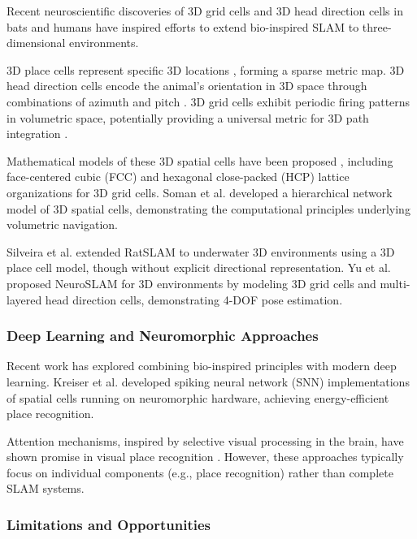 Recent neuroscientific discoveries of 3D grid cells and 3D head direction cells in bats \cite{Finkelstein2015, Finkelstein2016} and humans \cite{Kim2017, Kim2018a, Kim2018b, Kim2019} have inspired efforts to extend bio-inspired SLAM to three-dimensional environments.

3D place cells represent specific 3D locations \cite{Yartsev2013, Wohlgemuth2018}, forming a sparse metric map.
3D head direction cells encode the animal's orientation in 3D space through combinations of azimuth and pitch \cite{Finkelstein2015, Page2018, Shinder2019}.
3D grid cells exhibit periodic firing patterns in volumetric space, potentially providing a universal metric for 3D path integration \cite{Finkelstein2016, Casali2019}.

Mathematical models of these 3D spatial cells have been proposed \cite{Jeffery2013, Jeffery2015}, including face-centered cubic (FCC) and hexagonal close-packed (HCP) lattice organizations for 3D grid cells.
Soman et al. \cite{Soman2018} developed a hierarchical network model of 3D spatial cells, demonstrating the computational principles underlying volumetric navigation.

Silveira et al. \cite{Silveira2013, Silveira2015} extended RatSLAM to underwater 3D environments using a 3D place cell model, though without explicit directional representation.
Yu et al. proposed NeuroSLAM for 3D environments by modeling 3D grid cells and multi-layered head direction cells, demonstrating 4-DOF pose estimation.

\subsubsection{Deep Learning and Neuromorphic Approaches}

Recent work has explored combining bio-inspired principles with modern deep learning.
Kreiser et al. \cite{Kreiser2018a, Kreiser2018b} developed spiking neural network (SNN) implementations of spatial cells running on neuromorphic hardware, achieving energy-efficient place recognition.

Attention mechanisms, inspired by selective visual processing in the brain, have shown promise in visual place recognition \cite{Chen2017}.
However, these approaches typically focus on individual components (e.g., place recognition) rather than complete SLAM systems.

\subsubsection{Limitations and Opportunities}

